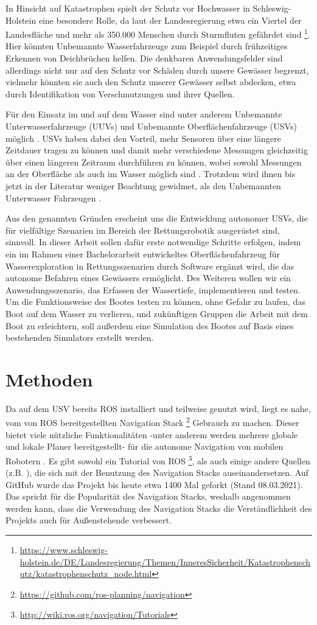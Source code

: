 \documentclass[conference]{IEEEtran}
\begin{document}
In Hinsicht auf Katastrophen spielt der Schutz vor Hochwasser in Schleswig-Holstein eine besondere Rolle, da laut der Landesregierung etwa ein Viertel der Landesfläche und mehr als 350.000 Menschen durch Sturmfluten gefährdet sind \footnote{\url{https://www.schleswig-holstein.de/DE/Landesregierung/Themen/InneresSicherheit/Katastrophenschutz/katastrophenschutz_node.html}}. Hier könnten Unbemannte Wasserfahrzeuge zum Beispiel durch frühzeitiges Erkennen von Deichbrüchen helfen. Die denkbaren Anwendungsfelder sind allerdings nicht nur auf den Schutz vor Schäden durch unsere Gewässer begrenzt, vielmehr könnten sie auch den Schutz unserer Gewässer selbst abdecken, etwa durch Identifikation von Verschmutzungen und ihrer Quellen.

Für den Einsatz im und auf dem Wasser sind unter anderem Unbemannte Unterwasserfahrzeuge (UUVs) und Unbemannte Oberflächenfahrzeuge (USVs) möglich \cite{surveyDisasterRobotics}. USVs haben dabei den Vorteil, mehr Sensoren über eine längere Zeitdauer tragen zu können und damit mehr verschiedene Messungen gleichzeitig über einen längeren Zeitraum durchführen zu können, wobei sowohl Messungen an der Oberfläche als auch im Wasser möglich sind \cite{coley2015}. Trotzdem wird ihnen bis jetzt in der Literatur weniger Beachtung gewidmet, als den Unbemannten Unterwasser Fahrzeugen \cite{surveyDisasterRobotics}.

Aus den genannten Gründen erscheint uns die Entwicklung autonomer USVs, die für vielfältige Szenarien im Bereich der Rettungsrobotik ausgerüstet sind, sinnvoll. In dieser Arbeit sollen dafür erste notwendige Schritte erfolgen, indem ein im Rahmen einer Bachelorarbeit entwickeltes Oberflächenfahrzeug für Wasserexploration in Rettungsszenarien durch Software ergänzt wird, die das autonome Befahren eines Gewässers ermöglicht. Des Weiteren wollen wir ein Anwendungsszenario, das Erfassen der Wassertiefe, implementieren und testen. Um die Funktionsweise des Bootes testen zu können, ohne Gefahr zu laufen, das Boot auf dem Wasser zu verlieren, und zukünftigen Gruppen die Arbeit mit dem Boot zu erleichtern, soll außerdem eine Simulation des Bootes auf Basis eines bestehenden Simulators erstellt werden.

\section{Methoden}
Da auf dem USV bereits ROS installiert und teilweise genutzt wird, liegt es nahe, vom von ROS bereitgestellten Navigation Stack \footnote{\url{https://github.com/ros-planning/navigation}} Gebrauch zu machen. Dieser bietet viele nützliche Funktionalitäten -unter anderem werden mehrere globale und lokale Planer bereitgestellt- für die autonome Navigation von mobilen Robotern \cite{zheng2019ros}. Es gibt sowohl ein Tutorial von ROS \footnote{\url{http://wiki.ros.org/navigation/Tutorials}}, als auch einige andere Quellen (z.B. \cite{zheng2019ros}), die sich mit der Benutzung des Navigation Stacks auseinandersetzen. Auf GitHub wurde das Projekt bis heute etwa 1400 Mal geforkt (Stand 08.03.2021). Das spricht für die Popularität des Navigation Stacks, weshalb angenommen werden kann, dass die Verwendung des Navigation Stacks die Verständlichkeit des Projekts auch für Außenstehende verbessert.
\end{document}
